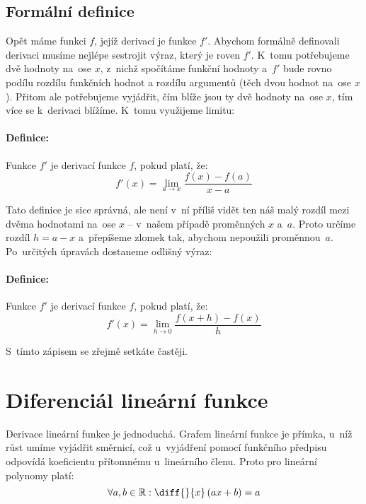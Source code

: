 \subsection{Formální definice}

Opět máme funkci $f$, jejíž derivací je funkce $f'$. Abychom formálně definovali
derivaci musíme nejlépe sestrojit výraz, který je roven $f'$. K~tomu potřebujeme dvě
hodnoty na~ose $x$, z~nichž spočítáme funkční hodnoty a~$f'$ bude rovno podílu
rozdílu funkčních hodnot a rozdílu argumentů (těch dvou hodnot na~ose $x$). Přitom
ale potřebujeme vyjádřit, čím blíže jsou ty dvě hodnoty na~ose $x$, tím více se
k~derivaci blížíme. K~tomu využijeme limitu:

\paragraph*{Definice:} Funkce $f'$ je derivací funkce $f$, pokud platí, že:
\begin{equation*}
    f'(x) = \lim_{a \to x} \frac{f(x) - f(a)}{x - a}
\end{equation*}

Tato definice je sice správná, ale není v~ní příliš vidět ten náš malý rozdíl mezi
dvěma hodnotami na~ose $x$ -- v~našem případě proměnných $x$ a~$a$. Proto určíme
rozdíl $h = a - x$ a~přepíšeme zlomek tak, abychom nepoužili proměnnou~$a$.
Po~určitých úpravách dostaneme odlišný výraz:

\paragraph*{Definice:} Funkce $f'$ je derivací funkce $f$, pokud platí, že:
\begin{equation*}
    f'(x) = \lim_{h \to 0} \frac{f(x + h) - f(x)}{h}
\end{equation*}

S~tímto zápisem se zřejmě setkáte častěji.

\vfill{}
\pagebreak
\section{Diferenciál lineární funkce}

Derivace lineární funkce je jednoduchá. Grafem lineární funkce je přímka, u~níž růst
umíme vyjádřit směrnicí, což u~vyjádření pomocí funkčního předpisu odpovídá
koeficientu přítomnému u~lineárního členu. Proto pro lineární polynomy platí:
\begin{equation*}
    \forall a, b \in \mathbb{R}: \diff{}{x} \left( ax + b \right) = a
\end{equation*}


